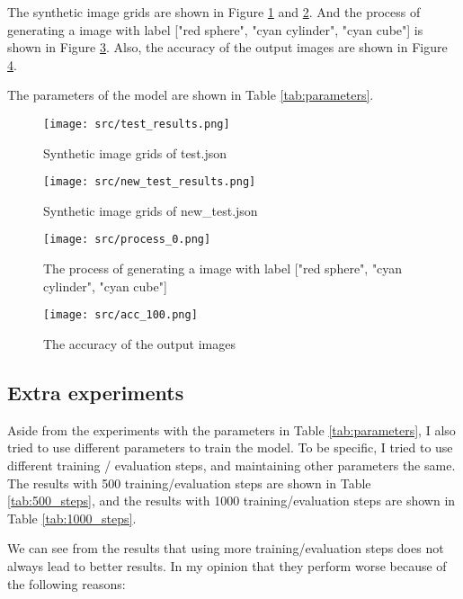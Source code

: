 The synthetic image grids are shown in Figure \ref{fig:synthetic_image_grids} and \ref{fig:synthetic_image_grids_new}.
And the process of generating a image with label ["red sphere", "cyan cylinder", "cyan cube"] is shown in Figure \ref{fig:process}.
Also, the accuracy of the output images are shown in Figure \ref{fig:accuracy_100}.

The parameters of the model are shown in Table \ref{tab:parameters}.

\begin{figure}[hb]
    \centering
    \texttt{[image: src/test\_results.png]}
    \caption{Synthetic image grids of test.json}
    \label{fig:synthetic_image_grids}
\end{figure}

\begin{figure}[hb]
    \centering
    \texttt{[image: src/new\_test\_results.png]}
    \caption{Synthetic image grids of new\_test.json}
    \label{fig:synthetic_image_grids_new}
\end{figure}

\begin{figure}[hb]
    \centering
    \texttt{[image: src/process\_0.png]}
    \caption{The process of generating a image with label ["red sphere", "cyan cylinder", "cyan cube"]}
    \label{fig:process}
\end{figure}

\begin{figure}[hb]
    \centering
    \texttt{[image: src/acc\_100.png]}
    \caption{The accuracy of the output images}
    \label{fig:accuracy_100}
\end{figure}

\subsection{Extra experiments}
Aside from the experiments with the parameters in Table \ref{tab:parameters}, I also tried to use different parameters to train the model.
To be specific, I tried to use different training / evaluation steps, and maintaining other parameters the same.
The results with 500 training/evaluation steps are shown in Table \ref{tab:500_steps}, and the results with 1000 training/evaluation steps are shown in Table \ref{tab:1000_steps}.

We can see from the results that using more training/evaluation steps does not always lead to better results.
In my opinion that they perform worse because of the following reasons:

